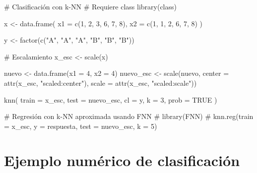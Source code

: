 \documentclass[
  spanish,
  10.5pt,
  letterpaper,
  DIV=11,
  numbers=noendperiod,
  oneside,
  open=any]{scrreprt}
\newenvironment{Shaded}{\begin{snugshade}}{\end{snugshade}}
\newcommand{\AttributeTok}[1]{\textcolor[rgb]{0.40,0.45,0.13}{#1}}
\newcommand{\CommentTok}[1]{\textcolor[rgb]{0.37,0.37,0.37}{#1}}
\newcommand{\ConstantTok}[1]{\textcolor[rgb]{0.56,0.35,0.01}{#1}}
\newcommand{\DecValTok}[1]{\textcolor[rgb]{0.68,0.00,0.00}{#1}}
\newcommand{\FunctionTok}[1]{\textcolor[rgb]{0.28,0.35,0.67}{#1}}
\newcommand{\NormalTok}[1]{\textcolor[rgb]{0.00,0.23,0.31}{#1}}
\newcommand{\OtherTok}[1]{\textcolor[rgb]{0.00,0.23,0.31}{#1}}
\newcommand{\StringTok}[1]{\textcolor[rgb]{0.13,0.47,0.30}{#1}}
\theoremstyle{definition}
\theoremstyle{definition}
\theoremstyle{plain}
\theoremstyle{remark}
\begin{document}
\begin{Shaded}
\begin{Highlighting}[numbers=left,,]
\CommentTok{\# Clasificación con k{-}NN}
\CommentTok{\# Requiere class}
\FunctionTok{library}\NormalTok{(class)}

\NormalTok{x }\OtherTok{\textless{}{-}} \FunctionTok{data.frame}\NormalTok{(}
  \AttributeTok{x1 =} \FunctionTok{c}\NormalTok{(}\DecValTok{1}\NormalTok{, }\DecValTok{2}\NormalTok{, }\DecValTok{3}\NormalTok{, }\DecValTok{6}\NormalTok{, }\DecValTok{7}\NormalTok{, }\DecValTok{8}\NormalTok{),}
  \AttributeTok{x2 =} \FunctionTok{c}\NormalTok{(}\DecValTok{1}\NormalTok{, }\DecValTok{1}\NormalTok{, }\DecValTok{2}\NormalTok{, }\DecValTok{6}\NormalTok{, }\DecValTok{7}\NormalTok{, }\DecValTok{8}\NormalTok{)}
\NormalTok{)}

\NormalTok{y }\OtherTok{\textless{}{-}} \FunctionTok{factor}\NormalTok{(}\FunctionTok{c}\NormalTok{(}\StringTok{"A"}\NormalTok{, }\StringTok{"A"}\NormalTok{, }\StringTok{"A"}\NormalTok{, }\StringTok{"B"}\NormalTok{, }\StringTok{"B"}\NormalTok{, }\StringTok{"B"}\NormalTok{))}

\CommentTok{\# Escalamiento}
\NormalTok{x\_esc }\OtherTok{\textless{}{-}} \FunctionTok{scale}\NormalTok{(x)}

\NormalTok{nuevo }\OtherTok{\textless{}{-}} \FunctionTok{data.frame}\NormalTok{(}\AttributeTok{x1 =} \DecValTok{4}\NormalTok{, }\AttributeTok{x2 =} \DecValTok{4}\NormalTok{)}
\NormalTok{nuevo\_esc }\OtherTok{\textless{}{-}} \FunctionTok{scale}\NormalTok{(nuevo,}
                   \AttributeTok{center =} \FunctionTok{attr}\NormalTok{(x\_esc, }\StringTok{"scaled:center"}\NormalTok{),}
                   \AttributeTok{scale =} \FunctionTok{attr}\NormalTok{(x\_esc, }\StringTok{"scaled:scale"}\NormalTok{))}

\FunctionTok{knn}\NormalTok{(}
  \AttributeTok{train =}\NormalTok{ x\_esc,}
  \AttributeTok{test =}\NormalTok{ nuevo\_esc,}
  \AttributeTok{cl =}\NormalTok{ y,}
  \AttributeTok{k =} \DecValTok{3}\NormalTok{,}
  \AttributeTok{prob =} \ConstantTok{TRUE}
\NormalTok{)}

\CommentTok{\# Regresión con k{-}NN aproximada usando FNN}
\CommentTok{\# library(FNN)}
\CommentTok{\# knn.reg(train = x\_esc, y = respuesta, test = nuevo\_esc, k = 5)}
\end{Highlighting}
\end{Shaded}

\section*{Ejemplo numérico de
clasificación}\label{ejemplo-numuxe9rico-de-clasificaciuxf3n}
\end{document}
